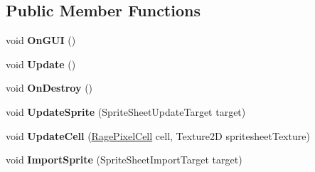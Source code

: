 \subsection*{Public Member Functions}
\begin{DoxyCompactItemize}
\item 
\hypertarget{class_rage_pixel_sprite_sheet_editor_window_ad2abff1de5b689d7c8ecabd64213b6d3}{void {\bfseries On\-G\-U\-I} ()}\label{class_rage_pixel_sprite_sheet_editor_window_ad2abff1de5b689d7c8ecabd64213b6d3}

\item 
\hypertarget{class_rage_pixel_sprite_sheet_editor_window_a2fdd9ac901809971b1f79437f8885416}{void {\bfseries Update} ()}\label{class_rage_pixel_sprite_sheet_editor_window_a2fdd9ac901809971b1f79437f8885416}

\item 
\hypertarget{class_rage_pixel_sprite_sheet_editor_window_ac6dabc031e6e6f37baa1a139582fad6f}{void {\bfseries On\-Destroy} ()}\label{class_rage_pixel_sprite_sheet_editor_window_ac6dabc031e6e6f37baa1a139582fad6f}

\item 
\hypertarget{class_rage_pixel_sprite_sheet_editor_window_ae6b2d647a8b0feb795a3966a7fb5b68e}{void {\bfseries Update\-Sprite} (Sprite\-Sheet\-Update\-Target target)}\label{class_rage_pixel_sprite_sheet_editor_window_ae6b2d647a8b0feb795a3966a7fb5b68e}

\item 
\hypertarget{class_rage_pixel_sprite_sheet_editor_window_a1de880bc4c4ab2722809f1e867dbdff8}{void {\bfseries Update\-Cell} (\hyperlink{class_rage_pixel_cell}{Rage\-Pixel\-Cell} cell, Texture2\-D spritesheet\-Texture)}\label{class_rage_pixel_sprite_sheet_editor_window_a1de880bc4c4ab2722809f1e867dbdff8}

\item 
\hypertarget{class_rage_pixel_sprite_sheet_editor_window_a25fb2b1e2876b3ab91389850027ed4cd}{void {\bfseries Import\-Sprite} (Sprite\-Sheet\-Import\-Target target)}\label{class_rage_pixel_sprite_sheet_editor_window_a25fb2b1e2876b3ab91389850027ed4cd}

\end{DoxyCompactItemize}
